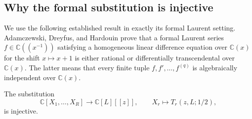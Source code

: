 \subsection{Why the formal substitution is injective}

We use the following established result in exactly its formal Laurent
setting. Adamczewski, Dreyfus, and Hardouin
\cite[Theorem~1.2, case $\mathbf S_\infty$]{ghp:ADH} prove that a formal
Laurent series $f\in\mathbb C((x^{-1}))$ satisfying a homogeneous linear
difference equation over $\mathbb C(x)$ for the shift $x\mapsto x+1$
is either rational or differentially transcendental over
$\mathbb C(x)$. The latter means that every finite tuple
$f,f',\ldots,f^{(q)}$ is algebraically independent over $\mathbb C(x)$.

\begin{lemma}
\label{ghp:lem:injective}
The substitution
\[
 \mathbb C[X_1,\ldots,X_R]\longrightarrow\mathbb C[L][[z]],
 \qquad X_r\longmapsto T_r(z,L;1/2),
\]
is injective.
\end{lemma}

